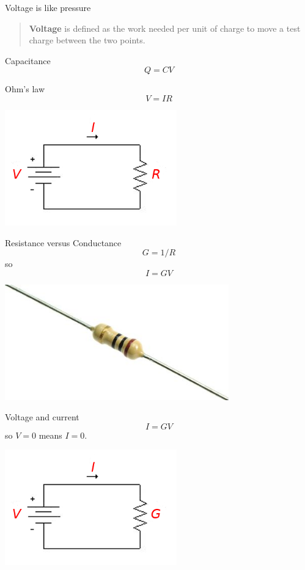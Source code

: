 \documentclass{beamer}
\newcommand{\crish}{\color{reddish}}
\newcommand{\cbla}{\color{black}}
\begin{document}
\begin{frame}{Voltage is like pressure}
  \begin{quote}
   \textbf{Voltage} is defined as the work needed per unit of charge to move a
    test charge between the two points.
  \end{quote}
\end{frame}


\begin{frame}{Capacitance}
\crish
$$Q=CV$$
\cbla  
\end{frame}


\begin{frame}{Ohm's law}
\crish
$$V=IR$$
\cbla
\begin{center}
    \includegraphics[height=5cm]{basic_circuit.png}
\end{center}
\end{frame}


\begin{frame}{Resistance versus Conductance}
\crish
$$G=1/R$$
\cbla{}so\crish
$$I=GV$$
\cbla
\begin{center}
    \includegraphics[height=5cm]{resistor.jpg}
\end{center}
\end{frame}


\begin{frame}{Voltage and current}
\crish
$$I=GV$$
\cbla{}so\crish{} $V=0$\cbla{} means \crish{} $I=0$\cbla{}.
\begin{center}
    \includegraphics[height=5cm]{basic_circuit_g.png}
\end{center}
\end{frame}
\end{document}
